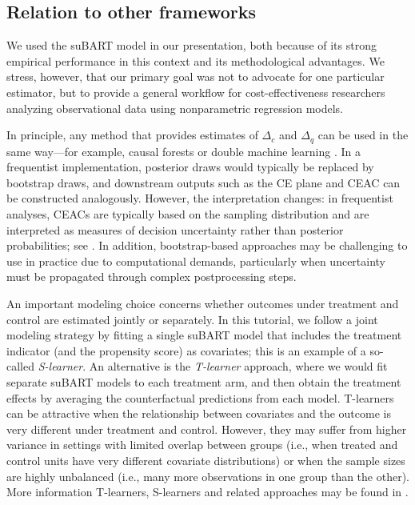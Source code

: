 \documentclass[aoas,preprint]{imsart}
\theoremstyle{plain}
\theoremstyle{definition}
\theoremstyle{remark}
\theoremstyle{remark}
\begin{document}
\subsection{Relation to other frameworks}
We used the suBART model in our presentation, both because of its strong empirical performance in this context and its methodological advantages. We stress, however, that our primary goal was not to advocate for one particular estimator, but to provide a general workflow for cost-effectiveness researchers analyzing observational data using nonparametric regression models.

In principle, any method that provides estimates of $\Delta_c$ and $\Delta_q$ can be used in the same way---for example, causal forests \citep{wager2018estimation} or double machine learning \citep{knaus2022double}. In a frequentist implementation, posterior draws would typically be replaced by bootstrap draws, and downstream outputs such as the CE plane and CEAC can be constructed analogously. However, the interpretation changes: in frequentist analyses, CEACs are typically based on the sampling distribution and are interpreted as measures of decision uncertainty rather than posterior probabilities; see \citet{lothgren2000definition}. In addition, bootstrap-based approaches may be challenging to use in practice due to computational demands, particularly when uncertainty must be propagated through complex postprocessing steps.

An important modeling choice concerns whether outcomes under treatment and control are estimated jointly or separately. In this tutorial, we follow a joint modeling strategy by fitting a single suBART model that includes the treatment indicator (and the propensity score) as covariates; this is an example of a so-called \emph{S-learner}. An alternative is the \emph{T-learner} approach, where we would fit separate suBART models to each treatment arm, and then obtain the treatment effects by averaging the counterfactual predictions from each model.
T-learners can be attractive when the relationship between covariates and the outcome is very different under treatment and control. However, they may suffer from higher variance in settings with limited overlap between groups (i.e., when treated and control units have very different covariate distributions) or when the sample sizes are highly unbalanced (i.e., many more observations in one group than the other).
More information T-learners, S-learners and related approaches may be found in \citet{caron2022estimating}.
\end{document}
